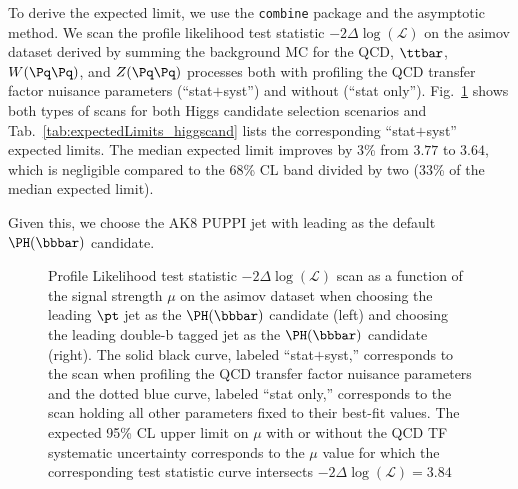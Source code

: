 To derive the expected limit, we use the \texttt{combine} package and the asymptotic method. We scan the profile likelihood test statistic  $-2\Delta\log(\mathcal{L})$ on the asimov dataset derived by summing the background MC for the QCD, $\ttbar$, $W(\Pq\Pq)$, and $Z(\Pq\Pq)$ processes both with profiling the QCD transfer factor nuisance parameters (``stat$+$syst'') and without (``stat only''). Fig.~\ref{fig:deltaLL_higgscand} shows both types of scans for both Higgs candidate selection scenarios and Tab.~\ref{tab:expectedLimits_higgscand} lists the corresponding ``stat$+$syst'' expected limits. The median expected limit improves by 3\% from $3.77$ to $3.64$, which is negligible compared to the 68\% CL band divided by two (33\% of the median expected limit). 

Given this, we choose the AK8 PUPPI jet with leading \pt as the default $\PH(\bbbar)$ candidate.

\begin{figure}[hbtp]
\centering
	\caption{Profile Likelihood test statistic $-2\Delta\log(\mathcal{L})$ scan as a function of the signal strength $\mu$ on the asimov dataset when choosing the leading $\pt$ jet as the $\PH(\bbbar)$ candidate (left) and choosing the leading double-b tagged jet as the $\PH(\bbbar)$  candidate (right). The solid black curve, labeled ``stat$+$syst,'' corresponds to the scan when profiling the QCD transfer factor nuisance parameters and the dotted blue curve, labeled ``stat only,'' corresponds to the scan holding all other parameters fixed to their best-fit values. The expected 95\% CL upper limit on $\mu$ with or without the QCD TF systematic uncertainty corresponds to the $\mu$ value for which the corresponding test statistic curve intersects $-2\Delta\log(\mathcal{L}) = 3.84$}
	\label{fig:deltaLL_higgscand}
 \end{figure}

